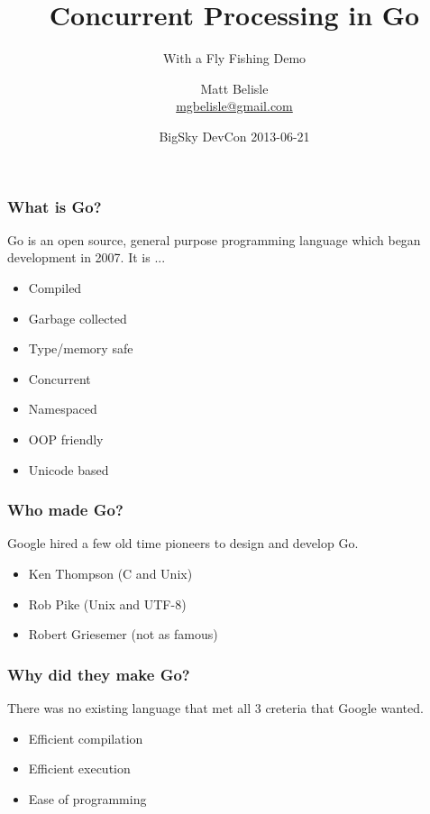 \documentclass{beamer}
\title{Concurrent Processing in Go}
\subtitle{With a Fly Fishing Demo}
\author{Matt Belisle\\ \href{mailto:mgbelisle@gmail.com}{mgbelisle@gmail.com}}
\date{BigSky DevCon 2013-06-21}
\begin{document}
\begin{frame}
  \titlepage
\end{frame}
\begin{frame}
  \frametitle{What is Go?}

  Go is an open source, general purpose programming language which
  began development in 2007.  It is ...
  
  \begin{itemize}
    \item Compiled
    \item Garbage collected
    \item Type/memory safe
    \item Concurrent
    \item Namespaced
    \item OOP friendly
    \item Unicode based
  \end{itemize}
\end{frame}
\begin{frame}
  \frametitle{Who made Go?}

  Google hired a few old time pioneers to design and develop Go.
  
  \begin{itemize}
    \item Ken Thompson (C and Unix)
    \item Rob Pike (Unix and UTF-8)
    \item Robert Griesemer (not as famous)
  \end{itemize}
\end{frame}
\begin{frame}
  \frametitle{Why did they make Go?}

  There was no existing language that met all 3 creteria that Google
  wanted.
  
  \begin{itemize}
    \item Efficient compilation
    \item Efficient execution
    \item Ease of programming
  \end{itemize}
\end{frame}
\end{document}

